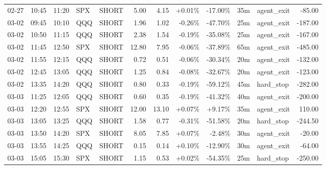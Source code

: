 \documentclass[11pt,a4paper,twoside]{article}
\begin{document}
\begin{center}
\begin{longtable}{>{\color{txtmain}}l l l l l r r r r r >{\color{txtmain}}l r}
02-27 & 10:45 & 11:20 & SPX & SHORT & 5.00 & 4.15 & \textcolor{wingreen}{+0.01\%} & \textcolor{lossred}{-17.00\%} & 35m & agent\_exit & \textcolor{lossred}{-85.00} \\
03-02 & 09:45 & 10:10 & QQQ & SHORT & 1.96 & 1.02 & \textcolor{lossred}{-0.26\%} & \textcolor{lossred}{-47.70\%} & 25m & agent\_exit & \textcolor{lossred}{-187.00} \\
03-02 & 10:50 & 11:15 & QQQ & SHORT & 2.38 & 1.54 & \textcolor{lossred}{-0.19\%} & \textcolor{lossred}{-35.08\%} & 25m & agent\_exit & \textcolor{lossred}{-167.00} \\
03-02 & 11:45 & 12:50 & SPX & SHORT & 12.80 & 7.95 & \textcolor{lossred}{-0.06\%} & \textcolor{lossred}{-37.89\%} & 65m & agent\_exit & \textcolor{lossred}{-485.00} \\
03-02 & 11:55 & 12:15 & QQQ & SHORT & 0.72 & 0.51 & \textcolor{lossred}{-0.06\%} & \textcolor{lossred}{-30.34\%} & 20m & agent\_exit & \textcolor{lossred}{-132.00} \\
03-02 & 12:45 & 13:05 & QQQ & SHORT & 1.25 & 0.84 & \textcolor{lossred}{-0.08\%} & \textcolor{lossred}{-32.67\%} & 20m & agent\_exit & \textcolor{lossred}{-123.00} \\
03-02 & 13:35 & 14:20 & QQQ & SHORT & 0.80 & 0.33 & \textcolor{lossred}{-0.19\%} & \textcolor{lossred}{-59.12\%} & 45m & hard\_stop & \textcolor{lossred}{-282.00} \\
03-03 & 11:25 & 12:05 & QQQ & SHORT & 0.60 & 0.35 & \textcolor{lossred}{-0.19\%} & \textcolor{lossred}{-41.32\%} & 40m & agent\_exit & \textcolor{lossred}{-200.00} \\
03-03 & 12:20 & 12:55 & SPX & SHORT & 12.00 & 13.10 & \textcolor{wingreen}{+0.07\%} & \textcolor{wingreen}{+9.17\%} & 35m & agent\_exit & \textcolor{wingreen}{110.00} \\
03-03 & 13:05 & 13:25 & QQQ & SHORT & 1.58 & 0.77 & \textcolor{lossred}{-0.31\%} & \textcolor{lossred}{-51.58\%} & 20m & hard\_stop & \textcolor{lossred}{-244.50} \\
03-03 & 13:50 & 14:20 & SPX & SHORT & 8.05 & 7.85 & \textcolor{wingreen}{+0.07\%} & \textcolor{lossred}{-2.48\%} & 30m & agent\_exit & \textcolor{lossred}{-20.00} \\
03-03 & 13:55 & 14:25 & QQQ & SHORT & 0.15 & 0.14 & \textcolor{wingreen}{+0.10\%} & \textcolor{lossred}{-12.90\%} & 30m & agent\_exit & \textcolor{lossred}{-64.00} \\
03-03 & 15:05 & 15:30 & SPX & SHORT & 1.15 & 0.53 & \textcolor{wingreen}{+0.02\%} & \textcolor{lossred}{-54.35\%} & 25m & hard\_stop & \textcolor{lossred}{-250.00} \\

\end{longtable}
\end{center}
\end{document}
